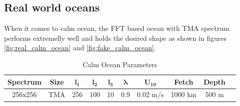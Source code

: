 \subsection{Real world oceans}
When it comes to calm ocean, the FFT based ocean with TMA spectrum performs extremelly well and holds the desired shape as shown in figures \ref{fig:real_calm_ocean} and \ref{fig:fake_calm_ocean}.
\begin{table}[h]
    \centering
    \begin{tabular}{|c|c|c|c|c|c|c|c|c|c|}
        \hline
        \textbf{Spectrum} & \textbf{Size} & $\mathbf{l_1}$ & $\mathbf{l_2}$ & $\mathbf{l_3}$ & $\mathbf{\lambda}$ & $\mathbf{U_{10}}$ & \textbf{Fetch} & \textbf{Depth} \\
        \hline
        256x256 & TMA & 256 & 100 & 10 & 0.9 & 0.02 m/s & 1000 km & 500 m \\
        \hline
    \end{tabular}
    \caption{Calm Ocean Parameters}
    \label{tab:calm_ocean}
\end{table}

